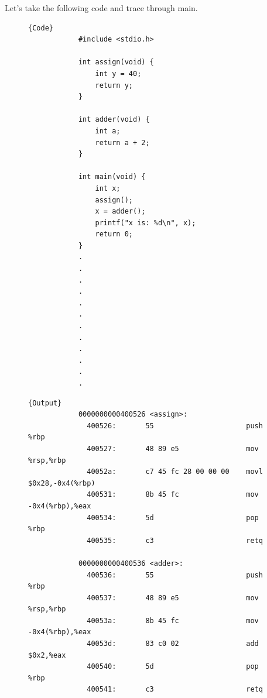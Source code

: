 \documentclass{article}
\begin{document}
      \begin{example}
        Let's take the following code and trace through main. 
        \begin{figure}[H]
          \centering 
          \noindent\begin{minipage}{.25\textwidth}
          \begin{lstlisting}[]{Code}
            #include <stdio.h>

            int assign(void) {
                int y = 40;
                return y;
            }

            int adder(void) {
                int a;
                return a + 2;
            }

            int main(void) {
                int x;
                assign();
                x = adder();
                printf("x is: %d\n", x);
                return 0;
            }
            .
            .
            .
            .
            .
            .
            .
            .
            .
            .
            .
            .
          \end{lstlisting}
          \end{minipage}
          \hfill
          \begin{minipage}{.74\textwidth}
          \begin{lstlisting}[]{Output}
            0000000000400526 <assign>:
              400526:       55                      push   %rbp
              400527:       48 89 e5                mov    %rsp,%rbp
              40052a:       c7 45 fc 28 00 00 00    movl   $0x28,-0x4(%rbp)
              400531:       8b 45 fc                mov    -0x4(%rbp),%eax
              400534:       5d                      pop    %rbp
              400535:       c3                      retq

            0000000000400536 <adder>:
              400536:       55                      push   %rbp
              400537:       48 89 e5                mov    %rsp,%rbp
              40053a:       8b 45 fc                mov    -0x4(%rbp),%eax
              40053d:       83 c0 02                add    $0x2,%eax
              400540:       5d                      pop    %rbp
              400541:       c3                      retq


\end{lstlisting}
\end{minipage}
\end{figure}
\end{example}
\end{document}
